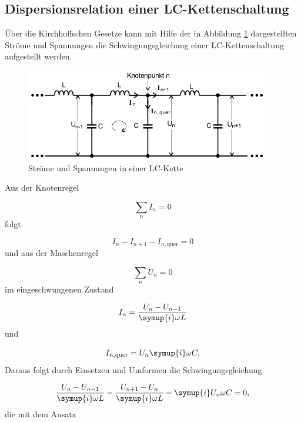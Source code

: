 \subsection{Dispersionsrelation einer LC-Kettenschaltung}

Über die Kirchhoffschen Gesetze kann mit Hilfe der in Abbildung
\ref{fig:KetteLC} dargestellten Ströme und Spannungen die Schwingungsgleichung
einer LC-Kettenschaltung aufgestellt werden.

\begin{figure}
  \centering
  \includegraphics[height=4cm]{KetteLC.png}
  \caption{Ströme und Spannungen in einer LC-Kette}
  \label{fig:KetteLC}
\end{figure}
Aus der Knotenregel

\begin{equation}
  \sum_{n} I_n = 0
  \label{eqn:Knoten}
\end{equation}
folgt

\begin{equation}
  I_n - I_{n+1} - I_{n,\text{quer}} = 0
\end{equation}
und aus der Maschenregel

\begin{equation}
  \sum_{n} U_n = 0
  \label{eqn:Masche}
\end{equation}
im eingeschwungenen Zustand

\begin{equation}
  I_{n} = \frac{U_{n} - U_{n-1}}{\symup{i} \omega L}
\end{equation}
und

\begin{equation}
  I_{n,\text{quer}} = U_{n} \symup{i} \omega C.
\end{equation}
Daraus folgt durch Einsetzen und Umformen die Schwingungsgleichung

\begin{equation}
  \frac{U_{n} - U_{n-1}}{\symup{i} \omega L} - \frac{U_{n+1} - U_{n}}{\symup{i}
  \omega L} - \symup{i} U_{n} \omega C = 0,
\end{equation}
die mit dem Ansatz

